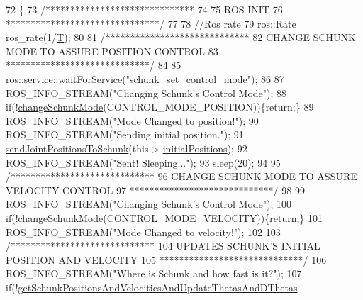 \begin{DoxyCode}
72                                        \{
73         \textcolor{comment}{/******************************}
74 \textcolor{comment}{}
75 \textcolor{comment}{                                ROS INIT}
76 \textcolor{comment}{        *******************************/}
77 
78         \textcolor{comment}{//Ros rate}
79         ros::Rate ros\_rate(1/\hyperlink{classCartesian__controller_a35c6ddbb9624878f2807ff644a33e832}{T});
80 
81         \textcolor{comment}{/*****************************}
82 \textcolor{comment}{           CHANGE SCHUNK MODE TO ASSURE POSITION CONTROL}
83 \textcolor{comment}{         *****************************/}
84 
85         ros::service::waitForService(\textcolor{stringliteral}{"schunk\_set\_control\_mode"});
86 
87         ROS\_INFO\_STREAM(\textcolor{stringliteral}{"Changing Schunk's Control Mode"});
88         \textcolor{keywordflow}{if}(!\hyperlink{classCartesian__controller_aaf006f80e89c08cf040956afbb4cf3c0}{changeSchunkMode}(CONTROL\_MODE\_POSITION))\{\textcolor{keywordflow}{return};\}
89         ROS\_INFO\_STREAM(\textcolor{stringliteral}{"Mode Changed to position!"});
90         ROS\_INFO\_STREAM(\textcolor{stringliteral}{"Sending initial position."});
91         \hyperlink{classCartesian__controller_ae845f67c81c2649bfbaccf95230f2599}{sendJointPositionsToSchunk}(this->
      \hyperlink{classCartesian__pose__controller_a42433d7f2e4e03ccaac56e1f9a7a5027}{initialPositions});
92         ROS\_INFO\_STREAM(\textcolor{stringliteral}{"Sent! Sleeping..."});
93         sleep(20);
94 
95         \textcolor{comment}{/*****************************}
96 \textcolor{comment}{           CHANGE SCHUNK MODE TO ASSURE VELOCITY CONTROL}
97 \textcolor{comment}{         *****************************/}
98 
99         ROS\_INFO\_STREAM(\textcolor{stringliteral}{"Changing Schunk's Control Mode"});
100         \textcolor{keywordflow}{if}(!\hyperlink{classCartesian__controller_aaf006f80e89c08cf040956afbb4cf3c0}{changeSchunkMode}(CONTROL\_MODE\_VELOCITY))\{\textcolor{keywordflow}{return};\}
101         ROS\_INFO\_STREAM(\textcolor{stringliteral}{"Mode Changed to velocity!"});
102 
103         \textcolor{comment}{/*****************************}
104 \textcolor{comment}{           UPDATES SCHUNK'S INITIAL POSITION AND VELOCITY}
105 \textcolor{comment}{         *****************************/}
106         ROS\_INFO\_STREAM(\textcolor{stringliteral}{"Where is Schunk and how fast is it?"});
107         \textcolor{keywordflow}{if}(!\hyperlink{classCartesian__controller_a0d7a63bac84715f6742db738df246f91}{getSchunkPositionsAndVelocitiesAndUpdateThetasAndDThetas}

\end{DoxyCode}

